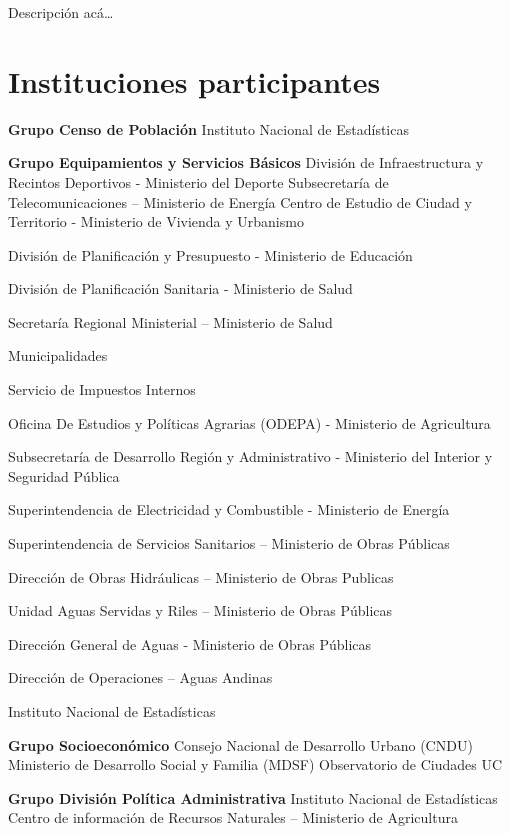 \documentclass[
]{book}
\theoremstyle{definition}
\theoremstyle{definition}
\theoremstyle{definition}
\theoremstyle{definition}
\theoremstyle{remark}
\begin{document}
Descripción acá\ldots{}

\hypertarget{instituciones-participantes}{%
\section*{Instituciones participantes}\label{instituciones-participantes}}

\textbf{Grupo Censo de Población}
Instituto Nacional de Estadísticas

\textbf{Grupo Equipamientos y Servicios Básicos}
División de Infraestructura y Recintos Deportivos - Ministerio del Deporte
Subsecretaría de Telecomunicaciones -- Ministerio de Energía
Centro de Estudio de Ciudad y Territorio - Ministerio de Vivienda y Urbanismo

División de Planificación y Presupuesto - Ministerio de Educación

División de Planificación Sanitaria - Ministerio de Salud

Secretaría Regional Ministerial -- Ministerio de Salud

Municipalidades

Servicio de Impuestos Internos

Oficina De Estudios y Políticas Agrarias (ODEPA) - Ministerio de Agricultura

Subsecretaría de Desarrollo Región y Administrativo - Ministerio del Interior y Seguridad Pública

Superintendencia de Electricidad y Combustible - Ministerio de Energía

Superintendencia de Servicios Sanitarios -- Ministerio de Obras Públicas

Dirección de Obras Hidráulicas -- Ministerio de Obras Publicas

Unidad Aguas Servidas y Riles -- Ministerio de Obras Públicas

Dirección General de Aguas - Ministerio de Obras Públicas

Dirección de Operaciones -- Aguas Andinas

Instituto Nacional de Estadísticas

\textbf{Grupo Socioeconómico}
Consejo Nacional de Desarrollo Urbano (CNDU)
Ministerio de Desarrollo Social y Familia (MDSF)
Observatorio de Ciudades UC

\textbf{Grupo División Política Administrativa}
Instituto Nacional de Estadísticas
Centro de información de Recursos Naturales -- Ministerio de Agricultura
\end{document}

